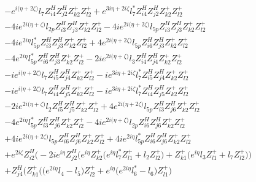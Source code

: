 \begin{align}
 &- e^{i \Big(\eta +2 \zeta \Big)} l_7 Z_{{i 4}}^{H} Z_{{j 2}}^{H} Z_{{k 2}}^{+} Z_{{l 2}}^{+} +e^{3 i \eta +2 i \zeta } l_7^* Z_{{i 4}}^{H} Z_{{j 2}}^{H} Z_{{k 2}}^{+} Z_{{l 2}}^{+} \nonumber \\ 
 &-4 i e^{2 i \Big(\eta +\zeta \Big)} l_{2p} Z_{{i 3}}^{H} Z_{{j 3}}^{H} Z_{{k 2}}^{+} Z_{{l 2}}^{+} -4 i e^{2 i \Big(\eta +2 \zeta \Big)} l_{5p} Z_{{i 3}}^{H} Z_{{j 3}}^{H} Z_{{k 2}}^{+} Z_{{l 2}}^{+} \nonumber \\ 
 &-4 i e^{2 i \eta } l_{5p}^* Z_{{i 3}}^{H} Z_{{j 3}}^{H} Z_{{k 2}}^{+} Z_{{l 2}}^{+} +4 e^{2 i \Big(\eta +2 \zeta \Big)} l_{5p} Z_{{i 6}}^{H} Z_{{j 3}}^{H} Z_{{k 2}}^{+} Z_{{l 2}}^{+} \nonumber \\ 
 &-4 e^{2 i \eta } l_{5p}^* Z_{{i 6}}^{H} Z_{{j 3}}^{H} Z_{{k 2}}^{+} Z_{{l 2}}^{+} -2 i e^{2 i \Big(\eta +\zeta \Big)} l_3 Z_{{i 4}}^{H} Z_{{j 4}}^{H} Z_{{k 2}}^{+} Z_{{l 2}}^{+} \nonumber \\ 
 &-i e^{i \Big(\eta +2 \zeta \Big)} l_7 Z_{{i 5}}^{H} Z_{{j 4}}^{H} Z_{{k 2}}^{+} Z_{{l 2}}^{+} -i e^{3 i \eta +2 i \zeta } l_7^* Z_{{i 5}}^{H} Z_{{j 4}}^{H} Z_{{k 2}}^{+} Z_{{l 2}}^{+} \nonumber \\ 
 &-i e^{i \Big(\eta +2 \zeta \Big)} l_7 Z_{{i 4}}^{H} Z_{{j 5}}^{H} Z_{{k 2}}^{+} Z_{{l 2}}^{+} -i e^{3 i \eta +2 i \zeta } l_7^* Z_{{i 4}}^{H} Z_{{j 5}}^{H} Z_{{k 2}}^{+} Z_{{l 2}}^{+} \nonumber \\ 
 &-2 i e^{2 i \Big(\eta +\zeta \Big)} l_2 Z_{{i 5}}^{H} Z_{{j 5}}^{H} Z_{{k 2}}^{+} Z_{{l 2}}^{+} +4 e^{2 i \Big(\eta +2 \zeta \Big)} l_{5p} Z_{{i 3}}^{H} Z_{{j 6}}^{H} Z_{{k 2}}^{+} Z_{{l 2}}^{+} \nonumber \\ 
 &-4 e^{2 i \eta } l_{5p}^* Z_{{i 3}}^{H} Z_{{j 6}}^{H} Z_{{k 2}}^{+} Z_{{l 2}}^{+} -4 i e^{2 i \Big(\eta +\zeta \Big)} l_{2p} Z_{{i 6}}^{H} Z_{{j 6}}^{H} Z_{{k 2}}^{+} Z_{{l 2}}^{+} \nonumber \\ 
 &+4 i e^{2 i \Big(\eta +2 \zeta \Big)} l_{5p} Z_{{i 6}}^{H} Z_{{j 6}}^{H} Z_{{k 2}}^{+} Z_{{l 2}}^{+} +4 i e^{2 i \eta } l_{5p}^* Z_{{i 6}}^{H} Z_{{j 6}}^{H} Z_{{k 2}}^{+} Z_{{l 2}}^{+} \nonumber \\ 
 &+e^{2 i \zeta } Z_{{i 2}}^{H} \Big(-2 i e^{i \eta } Z_{{j 2}}^{H} \Big(e^{i \eta } Z_{{k 2}}^{+} \Big(e^{i \eta } l_7^* Z_{{l 1}}^{+}  + l_2 Z_{{l 2}}^{+} \Big) + Z_{{k 1}}^{+} \Big(e^{i \eta } l_3 Z_{{l 1}}^{+}  + l_7 Z_{{l 2}}^{+} \Big)\Big)\nonumber \\ 
 &+Z_{{j 4}}^{H} \Big(Z_{{k 1}}^{+} \Big(\Big(e^{2 i \eta } l_4  - l_5 \Big)Z_{{l 2}}^{+}  + e^{i \eta } \Big(e^{2 i \eta } l_6^*  - l_6 \Big)Z_{{l 1}}^{+} \Big)\nonumber \\ 

\end{align}

